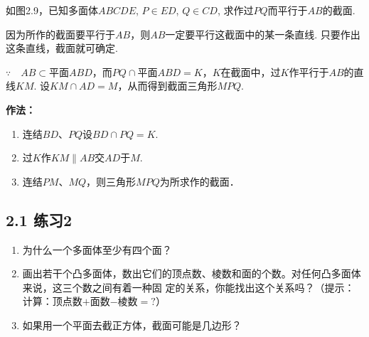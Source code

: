 \begin{example}
    如图2.9，已知多面体$ABCDE$, $P\in ED$, $Q\in CD$, 求作过$PQ$而平行于$AB$的截面.
\end{example}

\begin{analyze}
    因为所作的截面要平行于$AB$，则$AB$一定要平行这截面中的某一条直线. 只要作出这条直线，截面就可确定.
    
    $\because\quad AB\subset $平面$ABD$，而$PQ\cap $平面$ABD=K$，$K$在截面中，过$K$作平行于$AB$的直线$KM$. 设$KM\cap AD=M$，从而得到截面三角形$MPQ$.
\end{analyze}


\noindent
\begin{minipage}{.52\textwidth}\CTEXindent
\begin{solution}
\textbf{作法：}
\begin{enumerate}[(1)]
\item 连结$BD$、$PQ$设$BD\cap  PQ=K$.
\item 过$K$作$KM\parallel AB$交$AD$于$M$.
\item 连结$PM$、$MQ$，则三角形$MPQ$为所求作的截面． 
\end{enumerate}
\end{solution}
\end{minipage}
\hfill
\begin{minipage}{.45\textwidth}
\centering
{}
\end{minipage}

\subsection*{2.1 练习2}
\begin{enumerate}
\item 为什么一个多面体至少有四个面？
\item 画出若干个凸多面体，数出它们的顶点数、棱数和面的个数。对任何凸多面体来说，这三个数之间有着一种固
定的关系，你能找出这个关系吗？（提示：计算：顶点数$+$面数$-$棱数$=?$）
\item 如果用一个平面去截正方体，截面可能是几边形？
\end{enumerate}

